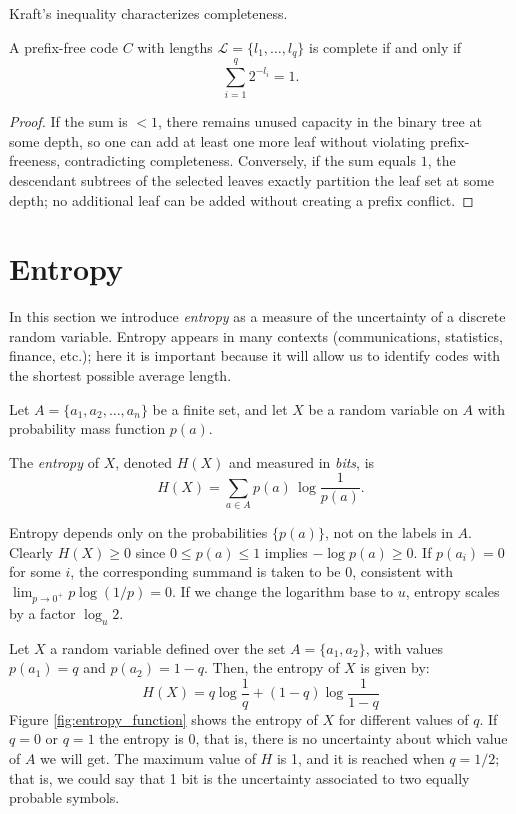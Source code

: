 Kraft's inequality characterizes completeness.

\begin{proposition}
A prefix-free code $C$ with lengths $\mathcal{L}=\{l_1,\ldots,l_q\}$ is complete if and only if
\[
\sum_{i=1}^q 2^{-l_i}=1.
\]
\end{proposition}
\begin{proof}
If the sum is $<1$, there remains unused capacity in the binary tree at some depth, so one can add at least one more leaf without violating prefix-freeness, contradicting completeness. Conversely, if the sum equals $1$, the descendant subtrees of the selected leaves exactly partition the leaf set at some depth; no additional leaf can be added without creating a prefix conflict.
\end{proof}

%
%

\section{Entropy}
\label{sec:Entropy}

In this section we introduce \emph{entropy} as a measure of the uncertainty of a discrete random variable. Entropy appears in many contexts (communications, statistics, finance, etc.); here it is important because it will allow us to identify codes with the shortest possible average length.

Let $A=\{a_1,a_2,\ldots,a_n\}$ be a finite set, and let $X$ be a random variable on $A$ with probability mass function $p(a)$.

\begin{definition}[Entropy]
The \emph{entropy} of $X$, denoted $H(X)$ and measured in \emph{bits}, is
\[
H(X)=\sum_{a\in A} p(a)\,\log\frac{1}{p(a)}.
\]
\end{definition}

Entropy depends only on the probabilities $\{p(a)\}$, not on the labels in $A$. Clearly $H(X)\ge 0$ since $0\le p(a)\le 1$ implies $-\log p(a)\ge 0$. If $p(a_i)=0$ for some $i$, the corresponding summand is taken to be $0$, consistent with $\lim_{p\to 0^+} p\log(1/p)=0$. If we change the logarithm base to $u$, entropy scales by a factor $\log_u 2$.

\begin{example}
Let $X$ a random variable defined over the set $A = \{a_1, a_2\}$, with values $p(a_1) = q$ and $p(a_2) = 1-q$. Then, the entropy of $X$ is given by:
\[
H(X) = q \log \frac{1}{q} + (1-q) \log \frac{1}{1-q}
\]
Figure \ref{fig:entropy_function} shows the entropy of $X$ for different values of $q$. If $q=0$ or $q=1$ the entropy is 0, that is, there is no uncertainty about which value of $A$ we will get. The maximum value of $H$ is 1, and it is reached when $q=1/2$; that is, we could say that 1 bit is the uncertainty associated to two equally probable symbols.
\end{example}

